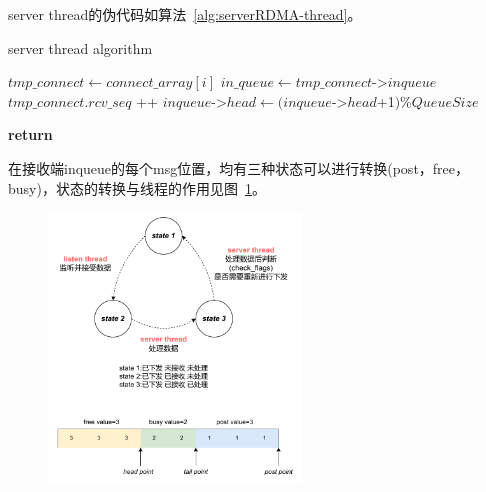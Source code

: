 {\begin{itemize}
              server thread的伪代码如算法~\ref{alg:serverRDMA-thread}。
              \begin{algorithm}
                  \caption{server thread algorithm}\label{alg:serverRDMA-thread}
                  \begin{algorithmic}[1] %
                      \State {}

                      \State $tmp\_connect \gets connect\_array[i]$
                      \State $in\_queue \gets tmp\_connect$->$inqueue$
                      \State {}
                      \State {}
                      \State {}
                      \State $tmp\_connect.rcv\_seq$ ++
                      \EndIf
                      \State $inqueue$->$head \gets (inqueue$->$head$+1$) \% QueueSize$
                      \EndIf
                      \EndFor

                      \State {}
                      \EndIf
                      \EndWhile
                      \State \textbf{return}
                      \EndProcedure
                  \end{algorithmic}
              \end{algorithm}
    \end{itemize}

    在接收端inqueue的每个msg位置，均有三种状态可以进行转换(post，free，busy)，状态的转换与线程的作用见图~\ref{fig:RDMA-recv-state}。
    \begin{figure}[H]
        \centering
        \includegraphics[width=0.6\textwidth]{Img/recv_state.drawio.pdf}
        \label{fig:RDMA-recv-state}
    \end{figure}

}
